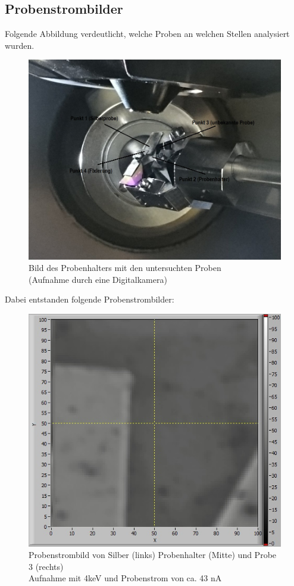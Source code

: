 \subsection{Probenstrombilder} %
\label{sub:probenstrombilder}
	
	Folgende Abbildung verdeutlicht, welche Proben an welchen Stellen analysiert wurden.

	\begin{figure}[H]
		\center
		\includegraphics[scale=0.4]{probe_photo_Bear.jpg}
		\caption{\centering Bild des Probenhalters mit den untersuchten Proben \\ (Aufnahme durch eine Digitalkamera)}
	\end{figure}

	Dabei entstanden folgende Probenstrombilder:

	\begin{figure}[H]
		\center
		\includegraphics[scale=0.5]{epic01.jpg}
		\caption{\centering Probenstrombild von Silber (links) Probenhalter (Mitte) und Probe 3 (rechts) \\ Aufnahme mit 4keV und Probenstrom von ca. 43 nA}
	\end{figure}

